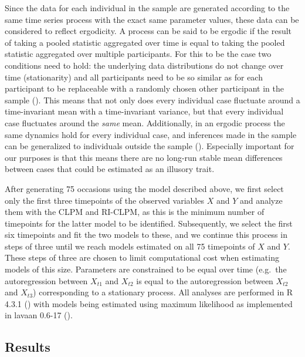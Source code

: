\documentclass[
  man,
  floatsintext,
  longtable,
  nolmodern,
  notxfonts,
  notimes,
  colorlinks=true,linkcolor=blue,citecolor=blue,urlcolor=blue]{apa7}
\begin{document}
Since the data for each individual in the sample are generated according
to the same time series process with the exact same parameter values,
these data can be considered to reflect ergodicity. A process can be
said to be ergodic if the result of taking a pooled statistic aggregated
over time is equal to taking the pooled statistic aggregated over
multiple participants. For this to be the case two conditions need to
hold: the underlying data distributions do not change over time
(stationarity) and all participants need to be so similar as for each
participant to be replaceable with a randomly chosen other participant
in the sample (). This means that not only does every individual
case fluctuate around a time-invariant mean with a time-invariant
variance, but that every individual case fluctuates around the
\emph{same} mean. Additionally, in an ergodic process the same dynamics
hold for every individual case, and inferences made in the sample can be
generalized to individuals outside the sample
(). Especially important for our purposes
is that this means there are no long-run stable mean differences between
cases that could be estimated as an illusory trait.

After generating 75 occasions using the model described above, we first
select only the first three timepoints of the observed variables \(X\)
and \(Y\) and analyze them with the CLPM and RI-CLPM, as this is the
minimum number of timepoints for the latter model to be identified.
Subsequently, we select the first six timepoints and fit the two models
to these, and we continue this process in steps of three until we reach
models estimated on all 75 timepoints of \(X\) and \(Y\). These steps of
three are chosen to limit computational cost when estimating models of
this size. Parameters are constrained to be equal over time (e.g.~the
autoregression between \(X_{t1}\) and \(X_{t2}\) is equal to the
autoregression between \(X_{t2}\) and \(X_{t3}\)) corresponding to a
stationary process. All analyses are performed in R 4.3.1
() with models being estimated
using maximum likelihood as implemented in lavaan 0.6-17
().

\subsection{Results}\label{results}
\end{document}
